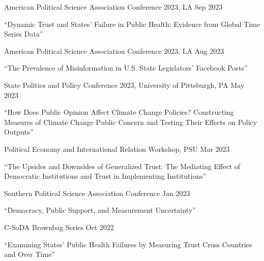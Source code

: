 \documentclass[10.5pt,]{article}
\providecommand{\tightlist}{%
	\setlength{\itemsep}{0pt}\setlength{\parskip}{0pt}}
\renewenvironment{itemize}{
	\begin{list}{}{
			\setlength{\leftmargin}{1.5em}
		}
	}{
	\end{list}
}
\begin{document}
\begin{itemize}
  \begin{itemize}
  \tightlist
  \item
    American Political Science Association Conference 2023, LA
    \hfill Sep 2023
  \end{itemize}
\item
  ``Dynamic Trust and States' Failure in Public Health: Evidence from
  Global Time Series Data''

  \begin{itemize}
  \tightlist
  \item
    American Political Science Association Conference 2023, LA
    \hfill Aug 2023
  \end{itemize}
\item
  ``The Prevalence of Misinformation in U.S. State Legislators' Facebook
  Posts''

  \begin{itemize}
  \tightlist
  \item
    State Politics and Policy Conference 2023, University of Pittsburgh,
    PA \hfill May 2023
  \end{itemize}
\item
  ``How Does Public Opinion Affect Climate Change Policies? Constructing
  Measures of Climate Change Public Concern and Testing Their Effects on
  Policy Outputs''

  \begin{itemize}
  \tightlist
  \item
    Political Economy and International Relation Workshop, PSU
    \hfill Mar 2023
  \end{itemize}
\item
  ``The Upsides and Downsides of Generalized Trust: The Mediating Effect
  of Democratic Institutions and Trust in Implementing Institutions''

  \begin{itemize}
  \tightlist
  \item
    Southern Political Science Association Conference \hfill Jan 2023
  \end{itemize}
\item
  ``Democracy, Public Support, and Measurement Uncertainty''

  \begin{itemize}
  \tightlist
  \item
    C-SoDA Brownbag Series \hfill Oct 2022
  \end{itemize}
\item
  ``Examining States' Public Health Failures by Measuring Trust Cross
  Countries and Over Time''


\end{itemize}
\end{document}
